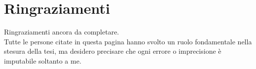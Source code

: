 \clearpage{\pagestyle{empty}\cleardoublepage}
\chapter*{Ringraziamenti}
\thispagestyle{empty}
Ringraziamenti ancora da completare.\\
Tutte le persone citate in questa pagina hanno svolto un ruolo fondamentale nella stesura della tesi, ma desidero precisare che ogni errore o imprecisione è imputabile soltanto a me.

